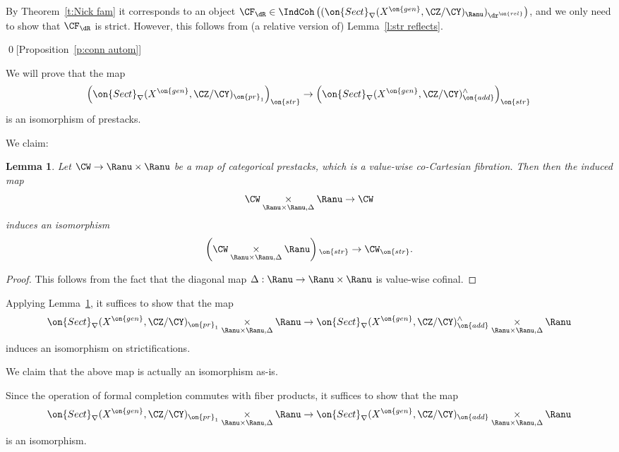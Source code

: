 \documentclass[9pt]{amsart}
\newtheorem{lem}[subsubsection]{Lemma}
\theoremstyle{remark}
\theoremstyle{definition}
\theoremstyle{remark}
\newcommand{\thmref}[1]{Theorem~\ref{#1}}
\newcommand{\lemref}[1]{Lemma~\ref{#1}}
\newcommand{\propref}[1]{Proposition~\ref{#1}}
\numberwithin{equation}{section}
\begin{document}
\medskip

By \thmref{t:Nick fam} it corresponds to an object 
$\CF_\dR\in \IndCoh\left((\on{Sect}_\nabla(X^{\on{gen}},\CZ/\CY)_\Ranu)_{\dr^{\on{rel}}}\right)$, and 
we only need to show that $\CF_\dR$ is strict. However, this follows from (a relative version of) \lemref{l:str reflects}.

\qed[\propref{p:conn autom}] 

\ssec{Proof of \lemref{l:cofinal}}

\sssec{}

We will prove that the map
$$\left(\on{Sect}_\nabla(X^{\on{gen}},\CZ/\CY)_{\on{pr}_1}\right)_{\on{str}}\to 
\left(\on{Sect}_\nabla(X^{\on{gen}},\CZ/\CY)^\wedge_{\on{add}}\right)_{\on{str}}$$
is an isomorphism of prestacks. 

\sssec{}

We claim:

\begin{lem}  \label{l:cofinal initial}
Let $\CW\to \Ranu\times \Ranu$ be a map of categorical prestacks, which is a value-wise co-Cartesian fibration.
Then then the induced map
$$\CW\underset{\Ranu\times \Ranu,\Delta}\times \Ranu\to \CW$$
induces an isomorphism
$$\left(\CW\underset{\Ranu\times \Ranu,\Delta}\times \Ranu\right){}_{\on{str}}\to \CW_{\on{str}}.$$
\end{lem}

\begin{proof}

This follows from the fact that the diagonal map $\Delta:\Ranu\to \Ranu\times \Ranu$ is value-wise cofinal.

\end{proof}

\sssec{}

Applying \lemref{l:cofinal initial}, it suffices to show that the map 
$$\on{Sect}_\nabla(X^{\on{gen}},\CZ/\CY)_{\on{pr}_1}\underset{\Ranu\times \Ranu,\Delta}\times \Ranu\to
\on{Sect}_\nabla(X^{\on{gen}},\CZ/\CY)^\wedge_{\on{add}}\underset{\Ranu\times \Ranu,\Delta}\times \Ranu$$
induces an isomorphism on strictifications.

\medskip

We claim that the above map is actually an isomorphism as-is.

\sssec{}

Since the operation of formal completion commutes with fiber products, it suffices to show that the map
$$\on{Sect}_\nabla(X^{\on{gen}},\CZ/\CY)_{\on{pr}_1}\underset{\Ranu\times \Ranu,\Delta}\times \Ranu\to
\on{Sect}_\nabla(X^{\on{gen}},\CZ/\CY)_{\on{add}}\underset{\Ranu\times \Ranu,\Delta}\times \Ranu$$
is an isomorphism.
\end{document}
